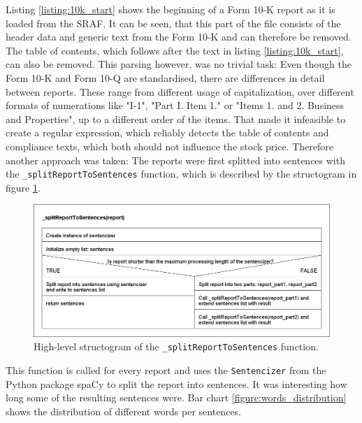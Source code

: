 \FloatBarrier

Listing \ref{listing:10k_start} shows the beginning of a Form 10-K report as it is loaded from the \ac{SRAF}.
It can be seen, that this part of the file consists of the header data and generic text from the Form 10-K and can therefore be removed.
The table of contents, which follows after the text in listing \ref{listing:10k_start}, can also be removed.
This parsing however, was no trivial task:
Even though the Form 10-K and Form 10-Q are standardised, there are differences in detail between reports.
These range from different usage of capitalization, over different formats of numerations like "I-1", "Part I. Item 1." or "Items 1. and 2. Business and Properties", up to a different order of the items.
That made it infeasible to create a regular expression, which reliably detects the table of contents and compliance texts, which both should not influence the stock price.
Therefore another approach was taken: The reports were first splitted into sentences with the \texttt{\_splitReportToSentences} function, which is described by the structogram in figure \ref{figure:structogram_splitReportToSentences}.
\begin{figure}[h]
    \centering
    \includegraphics[width=1\textwidth]{figures/structogram_splitReportToSentences.png}
    \caption{High-level structogram of the \texttt{\_splitReportToSentences} function.}
    \label{figure:structogram_splitReportToSentences}
\end{figure}
This function is called for every report and uses the \texttt{Sentencizer} from the Python package spaCy to split the report into sentences.
It was interesting how long some of the resulting sentences were.
Bar chart \ref{figure:words_distribution} shows the distribution of different words per sentences.
